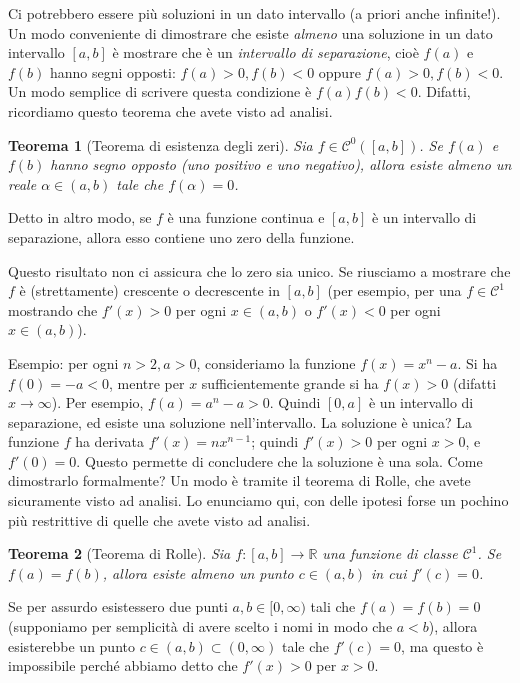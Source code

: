 \documentclass[a4paper]{report}
\newtheorem{theorem}{Teorema}[chapter]
\theoremstyle{definiton}
\theoremstyle{remark}
\begin{document}
Ci potrebbero essere più soluzioni in un dato intervallo (a priori anche infinite!). Un modo conveniente di dimostrare che esiste \emph{almeno} una soluzione in un dato intervallo $[a,b]$ è mostrare che è un \emph{intervallo di separazione}, cioè $f(a)$ e $f(b)$ hanno segni opposti: $f(a)>0,f(b)<0$ oppure $f(a)>0,f(b)<0$. Un modo semplice di scrivere questa condizione è $f(a)f(b) < 0$. Difatti, ricordiamo questo teorema che avete visto ad analisi.
\begin{theorem}[Teorema di esistenza degli zeri]
Sia $f \in \mathcal{C}^0([a,b])$. Se $f(a)$ e $f(b)$ hanno segno opposto (uno positivo e uno negativo), allora esiste almeno un reale $\alpha \in (a,b)$ tale che $f(\alpha) = 0$.
\end{theorem}
Detto in altro modo, se $f$ è una funzione continua e $[a,b]$ è un intervallo di separazione, allora esso contiene uno zero della funzione.

Questo risultato non ci assicura che lo zero sia unico. Se riusciamo a mostrare che $f$ è (strettamente) crescente o decrescente in $[a,b]$ (per esempio, per una $f\in\mathcal{C}^1$ mostrando che $f'(x) > 0$ per ogni $x\in (a,b)$ o $f'(x) < 0$ per ogni $x\in (a,b)$).

Esempio: per ogni $n>2, a > 0$, consideriamo la funzione $f(x) = x^n - a$. Si ha $f(0) = -a < 0$, mentre per $x$ sufficientemente grande si ha $f(x) > 0$ (difatti $x \to \infty$). Per esempio, $f(a) = a^n - a > 0$. Quindi $[0,a]$ è un intervallo di separazione, ed esiste una soluzione nell'intervallo. La soluzione è unica? La funzione $f$ ha derivata $f'(x) = nx^{n-1}$; quindi $f'(x) > 0$ per ogni $x > 0$, e $f'(0) = 0$. Questo permette di concludere che la soluzione è una sola. Come dimostrarlo formalmente? Un modo è tramite il teorema di Rolle, che avete sicuramente visto ad analisi. Lo enunciamo qui, con delle ipotesi forse un pochino più restrittive di quelle che avete visto ad analisi.
\begin{theorem}[Teorema di Rolle]
Sia $f:[a,b] \to \mathbb{R}$ una funzione di classe $\mathcal{C}^1$. Se $f(a) = f(b)$, allora esiste almeno un punto $c\in (a,b)$ in cui $f'(c) = 0$.
\end{theorem}

Se per assurdo esistessero due punti $a,b \in [0,\infty)$ tali che $f(a) = f(b) = 0$ (supponiamo per semplicità di avere scelto i nomi in modo che $a<b$), allora esisterebbe un punto $c \in (a,b) \subset (0,\infty)$ tale che $f'(c) = 0$, ma questo è impossibile perché abbiamo detto che $f'(x) > 0$ per $x>0$.
\end{document}
